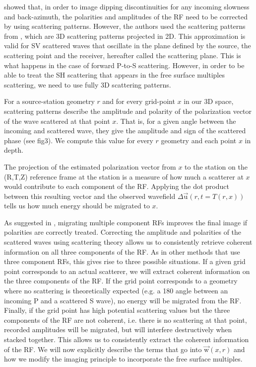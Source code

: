 \documentclass[9pt,a4paper]{article}
\numberwithin{equation}{section}
\begin{document}
\begin{multicols}{2}
\cite{cheng_gji_16} showed that, in order to image dipping discontinuities for any incoming slowness and back-azimuth, the polarities and amplitudes of the RF need to be corrected by using scattering patterns.
However, the authors used the scattering patterns from \cite{rond_sgeo_09}, which are 3D scattering patterns projected in 2D. 
This approximation is valid for SV scattered waves that oscillate in the plane defined by the source, the scattering point and the receiver, hereafter called the scattering plane. 
This is what happens in the case of forward P-to-S scattering.
However, in order to be able to treat the SH scattering that appears in the free surface multiples scattering, we need to use fully 3D scattering patterns. 

For a source-station geometry $r$ and for every grid-point $x$ in our 3D space, scattering patterns describe the amplitude and polarity of the polarization vector of the wave scattered at that point $x$. 
That is, for a given angle between the incoming and scattered wave, they give the amplitude and sign of the scattered phase (see fig3). 
We compute this value for every $r$ geometry and each point $x$ in depth. 

The projection of the estimated polarization vector from $x$ to the station on the (R,T,Z) reference frame at the station is a measure of how much a scatterer at $x$ would contribute to each component of the RF. 
Applying the dot product between this resulting vector and the observed wavefield $\Delta\vec{\text{u}}(r,t=T(r,x))$  tells us how much energy should be migrated to $x$.

As suggested in \cite{tone_epsl_08}, migrating multiple component RFs improves the final image if polarities are correctly treated.
Correcting the amplitude and polarities of the scattered waves using scattering theory allows us to consistently retrieve coherent information on all three components of the RF.
As in other methods that use three component RFs, this gives rise to three possible situations.
If a given grid point corresponds to an actual scatterer, we will extract coherent information on the three components of the RF.
If the grid point corresponds to a geometry where no scattering is theoretically expected (e.g. a 180 angle between an incoming P and a scattered S wave), no energy will be migrated from the RF. 
Finally, if the grid point has high potential scattering values but the three components of the RF are not coherent, i.e. there is no scattering at that point, recorded amplitudes will be migrated, but will interfere destructively when stacked together.
This allows us to consistently extract the coherent information of the RF. 
We will now explicitly describe the terms that go into $\vec{\text{w}}(x,r)$ and how we modify the imaging principle to incorporate the free surface multiples.


\end{multicols}
\end{document}
